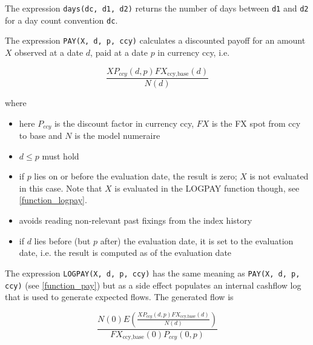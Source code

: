 
The expression \verb+days(dc, d1, d2)+ returns the number of days between \verb+d1+ and \verb+d2+ for a day count
convention \verb+dc+.

\label{function_pay}

The expression {\tt PAY(X, d, p, ccy)} calculates a discounted payoff for an amount $X$ observed at a date $d$, paid at a
date $p$ in currency ccy, i.e.
  
\begin{equation}
  \frac{X P_{ccy}(d,p) FX_{\text{ccy},\text{base}}(d)}{N(d)}
\end{equation}

where
\begin{itemize}
\item here $P_{ccy}$ is the discount factor in currency ccy, $FX$ is the FX spot from ccy to base and $N$ is the model
  numeraire
\item $d\leq p$ must hold
\item if $p$ lies on or before the evaluation date, the result is zero; $X$ is not evaluated in this case. 
Note that $X$ is evaluated in the LOGPAY function though, see \ref{function_logpay}.
\item avoids reading non-relevant past fixings from the index history
\item if $d$ lies before (but $p$ after) the evaluation date, it is set to the evaluation date, i.e. the result is
  computed as of the evaluation date
\end{itemize}

\label{function_logpay}

The expression {\tt LOGPAY(X, d, p, ccy)} has the same meaning as {\tt PAY(X, d, p, ccy)} (see \ref{function_pay}) but
as a side effect populates an internal cashflow log that is used to generate expected flows. The generated flow is

\begin{equation}
  \frac{ N(0) E\left(\frac{X P_{ccy}(d,p) FX_{\text{ccy},\text{base}}(d)}{N(d)}\right) }{ FX_{\text{ccy},\text{base}}(0) P_{ccy}(0,p) }
\end{equation}

